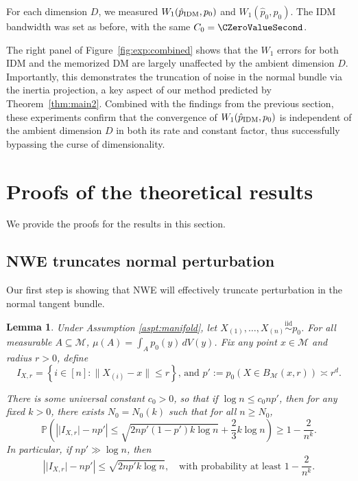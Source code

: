 \documentclass{article}
\newtheorem{lemma}[theorem]{Lemma}
\newcommand{\IDM}{\textnormal{IDM}}
\begin{document}
For each dimension $D$, we measured $W_1(\hat{p}_{\IDM}, p_0)$ and $W_1(\hat{p}_{0}, p_0)$. The IDM bandwidth was set as before, with the same $C_0 = \CZeroValueSecond$.

The right panel of Figure~\ref{fig:exp:combined} shows that the $W_1$ errors for both IDM and the memorized DM are largely unaffected by the ambient dimension $D$. Importantly, this demonstrates the  truncation of noise in the normal bundle via the inertia projection, a key aspect of our method predicted by Theorem~\ref{thm:main2}.
Combined with the findings from the previous section, these experiments confirm that the convergence of $W_1(\hat{p}_{\IDM}, p_0)$ is independent of the ambient dimension $D$ in both its rate and constant factor, thus successfully bypassing the curse of dimensionality.
















\section{Proofs of the theoretical results}
\label{sec:proof}
We provide the proofs for the results in this section.

\subsection{NWE truncates normal perturbation}
Our first step is showing that NWE will effectively truncate perturbation in the normal tangent bundle. 
\begin{lemma}
\label{lem:ball}
Under Assumption \ref{aspt:manifold}, let $X_{(1)}, \dots, X_{(n)} \overset{\text{iid}}{\sim} p_0$. 
For all measurable $\displaystyle A \subseteq \mathcal{M}$, $\mu(A) = \int_A p_0(y) \, dV(y)$.
Fix any point \( x \in \mathcal{M} \) and radius \( r > 0 \), define \[I_{X,r} = \left\{ i \in [n] : \|X_{(i)} - x\| \le r \right\}\text{, and } p' := p_0(X \in B_{\mathcal{M}}(x, r)) \asymp  r^d.\] 

There is some universal constant \( c_0 > 0 \), so that if 
\( \log n \le c_0 n p' \), then for any fixed \( k > 0 \), there exists \( N_0 = N_0(k) \) such that for all \( n \ge N_0 \),
\[
\mathbb{P}\left( \left| \lvert I_{X,r} \rvert - n p' \right| \le \sqrt{2 n p' (1 - p') k \log n} + \frac{2}{3} k \log n \right) \ge 1 - \frac{2}{n^k}.
\]
In particular, if \( n p' \gg \log n \), then
\[
\left| \lvert I_{X,r} \rvert - n p' \right| \leq \sqrt{2 n p' k \log n}, \quad \text{with probability at least } 1 - \frac{2}{n^k}.
\]
\end{lemma}
\end{document}
